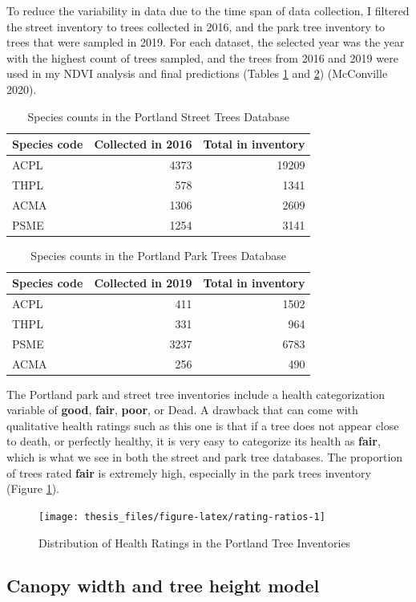 \documentclass[12pt,twoside]{reedthesis}
\begin{document}
To reduce the variability in data due to the time span of data
collection, I filtered the street inventory to trees collected in 2016,
and the park tree inventory to trees that were sampled in 2019. For each
dataset, the selected year was the year with the highest count of trees
sampled, and the trees from 2016 and 2019 were used in my NDVI analysis
and final predictions (Tables \ref{tab:streettable} and
\ref{tab:parktable}) (McConville 2020).
\begin{table}

\caption[Species counts in Street Trees Database]{\label{tab:streettable}Species counts in the Portland Street Trees Database}
\centering
\begin{tabular}[t]{lrr}
\toprule
Species code & Collected in 2016 & Total in inventory\\
\midrule
ACPL & 4373 & 19209\\
THPL & 578 & 1341\\
ACMA & 1306 & 2609\\
PSME & 1254 & 3141\\
\bottomrule
\end{tabular}
\end{table}
\begin{table}

\caption[Species counts in Park Trees Database]{\label{tab:parktable}Species counts in the Portland Park Trees Database}
\centering
\begin{tabular}[t]{lrr}
\toprule
Species code & Collected in 2019 & Total in inventory\\
\midrule
ACPL & 411 & 1502\\
THPL & 331 & 964\\
PSME & 3237 & 6783\\
ACMA & 256 & 490\\
\bottomrule
\end{tabular}
\end{table}
The Portland park and street tree inventories include a health
categorization variable of \textbf{good}, \textbf{fair}, \textbf{poor}, or Dead. A
drawback that can come with qualitative health ratings such as this one
is that if a tree does not appear close to death, or perfectly healthy,
it is very easy to categorize its health as \textbf{fair}, which is what we
see in both the street and park tree databases. The proportion of trees
rated \textbf{fair} is extremely high, especially in the park trees inventory
(Figure \ref{fig:rating-ratios}).
\begin{figure}

{\centering \texttt{[image: thesis\_files/figure-latex/rating-ratios-1]} 

}

\caption{Distribution of Health Ratings in the Portland Tree Inventories}\label{fig:rating-ratios}
\end{figure}
\hypertarget{canopy-width-and-tree-height-model}{%
\subsection{Canopy width and tree height model}\label{canopy-width-and-tree-height-model}}
\end{document}
